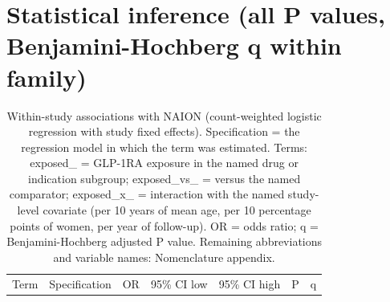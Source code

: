 \documentclass[journal]{IEEEtran}
\begin{document}
\section{Statistical inference (all P values, Benjamini-Hochberg q
within
family)}\label{statistical-inference-all-p-values-benjamini-hochberg-q-within-family}

{\footnotesize
\begin{longtable}[]{@{}
  >{\raggedright\arraybackslash}p{}
  >{\raggedright\arraybackslash}p{}
  >{\raggedright\arraybackslash}p{}
  >{\raggedright\arraybackslash}p{}
  >{\raggedright\arraybackslash}p{}
  >{\raggedright\arraybackslash}p{}
  >{\raggedright\arraybackslash}p{}@{}}
\caption{Within-study associations with NAION (count-weighted logistic
regression with study fixed effects). Specification = the regression
model in which the term was estimated. Terms: exposed\_ = GLP-1RA
exposure in the named drug or indication subgroup; exposed\_vs\_ =
versus the named comparator; exposed\_x\_ = interaction with the named
study-level covariate (per 10 years of mean age, per 10 percentage
points of women, per year of follow-up). OR = odds ratio; q =
Benjamini-Hochberg adjusted P value. Remaining abbreviations and
variable names: Nomenclature appendix.}\tabularnewline
\toprule\noalign{}
\begin{minipage}[b]{\linewidth}\raggedright
Term
\end{minipage} & \begin{minipage}[b]{\linewidth}\raggedright
Specification
\end{minipage} & \begin{minipage}[b]{\linewidth}\raggedright
OR
\end{minipage} & \begin{minipage}[b]{\linewidth}\raggedright
95\% CI low
\end{minipage} & \begin{minipage}[b]{\linewidth}\raggedright
95\% CI high
\end{minipage} & \begin{minipage}[b]{\linewidth}\raggedright
P
\end{minipage} & \begin{minipage}[b]{\linewidth}\raggedright
q
\end{minipage} \\

\end{longtable}}
\end{document}

